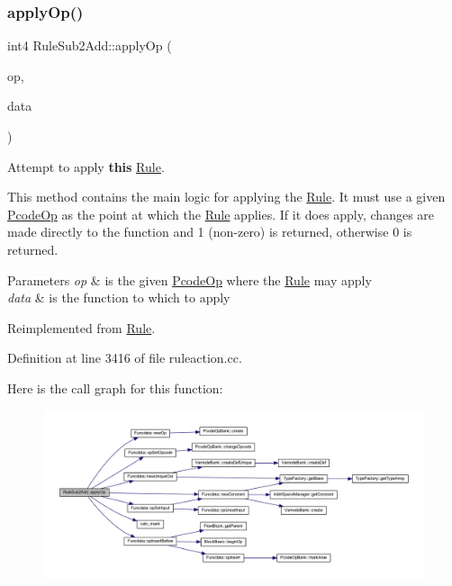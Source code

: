 \subsubsection{\texorpdfstring{applyOp()}{applyOp()}}
{\footnotesize\ttfamily int4 Rule\+Sub2\+Add\+::apply\+Op (\begin{DoxyParamCaption}\item[{\mbox{\hyperlink{class_pcode_op}{Pcode\+Op}} $\ast$}]{op,  }\item[{\mbox{\hyperlink{class_funcdata}{Funcdata}} \&}]{data }\end{DoxyParamCaption})\hspace{0.3cm}{\ttfamily [virtual]}}



Attempt to apply {\bfseries{this}} \mbox{\hyperlink{class_rule}{Rule}}. 

This method contains the main logic for applying the \mbox{\hyperlink{class_rule}{Rule}}. It must use a given \mbox{\hyperlink{class_pcode_op}{Pcode\+Op}} as the point at which the \mbox{\hyperlink{class_rule}{Rule}} applies. If it does apply, changes are made directly to the function and 1 (non-\/zero) is returned, otherwise 0 is returned. 
\begin{DoxyParams}{Parameters}
{\em op} & is the given \mbox{\hyperlink{class_pcode_op}{Pcode\+Op}} where the \mbox{\hyperlink{class_rule}{Rule}} may apply \\
\hline
{\em data} & is the function to which to apply \\
\hline
\end{DoxyParams}


Reimplemented from \mbox{\hyperlink{class_rule_a4e3e61f066670175009f60fb9dc60848}{Rule}}.



Definition at line 3416 of file ruleaction.\+cc.

Here is the call graph for this function\+:
\nopagebreak
\begin{figure}[H]
\begin{center}
\leavevmode
\includegraphics[width=350pt]{class_rule_sub2_add_adb3ba6d1c2c81fe6bc441ca0e4882e6a_cgraph}
\end{center}
\end{figure}
\mbox{\label{class_rule_sub2_add_a2dba60f5a3f711b7320adda2b9f8f92e}} 
